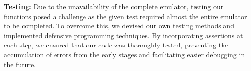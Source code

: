 \documentclass{article}
\begin{document}
   

    \textbf{Testing:} Due to the unavailability of the complete emulator, testing our functions posed a challenge as the given test required almost the entire emulator to be completed. To overcome this, we devised our own testing methods and implemented defensive programming techniques. By incorporating assertions at each step, we ensured that our code was thoroughly tested, preventing the accumulation of errors from the early stages and facilitating easier debugging in the future.


    
    
    \bigskip
    
\end{document}

